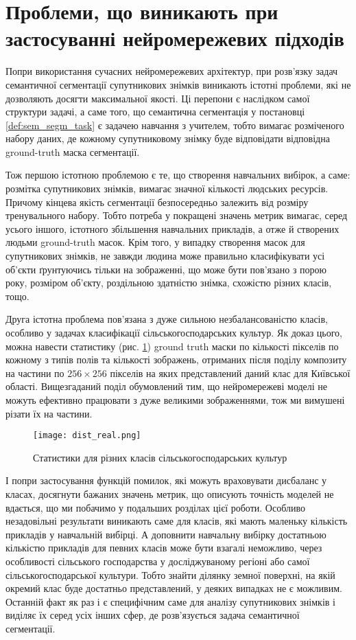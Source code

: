 \section{Проблеми, що виникають при застосуванні нейромережевих підходів}

Попри використання сучасних нейромережевих
архітектур, при розв'язку задач
семантичної сегментації супутникових знімків
виникають істотні проблеми, які не дозволяють
досягти максимальної якості. Ці перепони
є наслідком самої структури задачі, а саме того, що
семантична сегментація у постановці \ref{def:sem_segm_task}
є задачею навчання з учителем, тобто вимагає розміченого
набору даних, де кожному супутниковому знімку буде
відповідати відповідна ground-truth маска сегментації.

Тож першою істотною проблемою є те, що створення
навчальних вибірок, а саме: розмітка супутникових знімків,
вимагає значної кількості людських ресурсів. Причому кінцева
якість сегментації безпосередньо залежить від
розміру тренувального набору. Тобто потреба у
покращені значень метрик вимагає, серед усього іншого,
істотного збільшення навчальних прикладів,
а отже й створених людьми ground-truth масок.
Крім того, у випадку створення масок для супутникових знімків,
не завжди людина може правильно класифікувати усі об'єкти ґрунтуючись
тільки на зображенні, що може бути пов'язано з порою року,
розміром об'єкту, роздільною здатністю знімка, схожістю різних класів, тощо.

Друга істотна проблема пов'язана з дуже сильною
незбалансованістю класів, особливо у задачах класифікації
сільськогосподарських культур. Як доказ цього, можна
навести статистику (рис. \ref{fig:pixels_per_class}) ground truth
маски по кількості пікселів по кожному з
типів полів та кількості зображень, отриманих після
поділу композиту на частини по $256 \times 256$ пікселів
на яких представлений даний клас для Київської області.
Вищезгаданий поділ обумовлений тим, що нейромережеві моделі не
можуть ефективно працювати з дуже великими зображеннями,
тож ми вимушені різати їх на частини.

\begin{figure}[ht!]
    \centering
    \texttt{[image: dist\_real.png]}
    \caption{Статистики для різних класів сільськогосподарських культур}
    \label{fig:pixels_per_class}
\end{figure}

І попри застосування
функцій помилок, які можуть враховувати дисбаланс у
класах, досягнути бажаних значень метрик, що описують точність
моделей не вдається, що ми побачимо у подальших розділах цієї роботи.
Особливо незадовільні результати виникають саме для класів,
які мають маленьку кількість прикладів у навчальній вибірці.
А доповнити навчальну вибірку достатньою кількістю
прикладів для певних класів може бути взагалі неможливо,
через особливості сільського господарства у досліджуваному регіоні
або самої сільськогосподарської культури. Тобто знайти
ділянку земної поверхні, на якій окремий клас
буде достатньо представлений, у деяких випадках
не є можливим. Останній факт як раз
і є специфічним саме для аналізу супутникових знімків і
виділяє їх серед усіх інших сфер,
де розв'язується задача семантичної сегментації.

